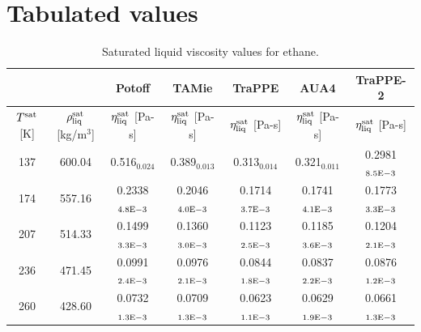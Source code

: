 \documentclass[preprint,review,12pt]{elsarticle}
\begin{document}

    \clearpage

	\section{Tabulated values} \label{SI:Tabulated}
	
	\begin{table}[H]
		\caption{Saturated liquid viscosity values for ethane.}
		\begin{center}
			\begin{tabular}{|c|c|c|c|c|c|c|}
				\hline
				&                                       & Potoff            & TAMie             & TraPPE 	& AUA4	& TraPPE-2            \\ \hline
				$T^{\rm sat}$ {[}K{]} & $\rho^{\rm sat}_{\rm liq}$ [kg/m$^3$] & $\eta_{\rm liq}^{\rm sat}$ {[}Pa-s{]} & $\eta_{\rm liq}^{\rm sat}$ {[}Pa-s{]} & $\eta_{\rm liq}^{\rm sat}$ {[}Pa-s{]} & $\eta_{\rm liq}^{\rm sat}$ {[}Pa-s{]} & $\eta_{\rm liq}^{\rm sat}$ {[}Pa-s{]} \\ \hline
				137 & 600.04 & 0.516$_{0.024}$   & 0.389$_{0.013}$   & 0.313$_{0.014}$   & 0.321$_{0.011}$   & 0.2981$_{8.5 \rm E-3}$ \\ \hline
				174 & 557.16 & 0.2338$_{4.8 \rm E-3}$ & 0.2046$_{4.0 \rm E-3}$ & 0.1714$_{3.7 \rm E-3}$ & 0.1741$_{4.1 \rm E-3}$ & 0.1773$_{3.3 \rm E-3}$ \\ \hline
				207 & 514.33 & 0.1499$_{3.3 \rm E-3}$ & 0.1360$_{3.0 \rm E-3}$ & 0.1123$_{2.5 \rm E-3}$ & 0.1185$_{3.6 \rm E-3}$ & 0.1204$_{2.1 \rm E-3}$ \\ \hline
				236 & 471.45 & 0.0991$_{2.4 \rm E-3}$ & 0.0976$_{2.1 \rm E-3}$ & 0.0844$_{1.8 \rm E-3}$ & 0.0837$_{2.2 \rm E-3}$ & 0.0876$_{1.2 \rm E-3}$ \\ \hline
				260 & 428.60 & 0.0732$_{1.3 \rm E-3}$ & 0.0709$_{1.3 \rm E-3}$ & 0.0623$_{1.1 \rm E-3}$ & 0.0629$_{1.9 \rm E-3}$ & 0.0661$_{1.3 \rm E-3}$ \\ \hline
			\end{tabular}
		\end{center}
	\end{table}
\end{document}

